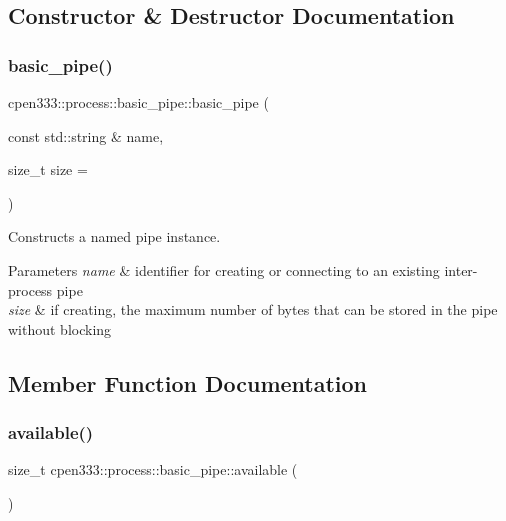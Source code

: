 \subsection{Constructor \& Destructor Documentation}
\mbox{\label{classcpen333_1_1process_1_1basic__pipe_af61543ec6433ad27cac0433a138199b7}} 
\subsubsection{\texorpdfstring{basic\+\_\+pipe()}{basic\_pipe()}}
{\footnotesize\ttfamily cpen333\+::process\+::basic\+\_\+pipe\+::basic\+\_\+pipe (\begin{DoxyParamCaption}\item[{const std\+::string \&}]{name,  }\item[{size\+\_\+t}]{size = {} }\end{DoxyParamCaption})\hspace{0.3cm}{\ttfamily [inline]}}



Constructs a named pipe instance. 


\begin{DoxyParams}{Parameters}
{\em name} & identifier for creating or connecting to an existing inter-\/process pipe \\
\hline
{\em size} & if creating, the maximum number of bytes that can be stored in the pipe without blocking \\
\hline
\end{DoxyParams}


\subsection{Member Function Documentation}
\mbox{\label{classcpen333_1_1process_1_1basic__pipe_a409e54ba4fd21f9769105804eb118fae}} 
\subsubsection{\texorpdfstring{available()}{available()}}
{\footnotesize\ttfamily size\+\_\+t cpen333\+::process\+::basic\+\_\+pipe\+::available (\begin{DoxyParamCaption}{ }\end{DoxyParamCaption})\hspace{0.3cm}{\ttfamily [inline]}}



